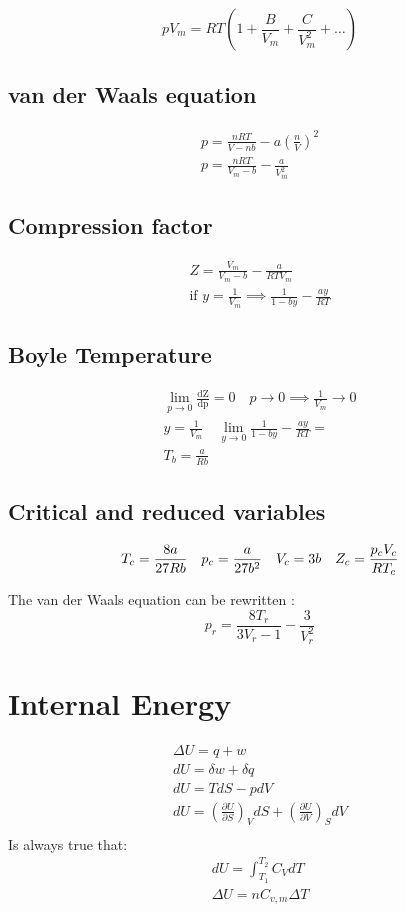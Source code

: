 \documentclass[a4paper]{report}
\begin{document}
\begin{multicols}{2}
        \[
        pV_{m}=RT\left( 1+\frac{B}{V_{m}}+\frac{C}{V^{2}_{m}}+\dots \right) 
        \] 

        \subsection{van der Waals equation}
        \begin{gather*}
          p = \frac{nRT}{V-nb} - a \left(\frac{n}{V} \right) ^{2}  \\
          p = \frac{nRT}{V_{m} - b } - \frac{a}{V_{m}^2}
        \end{gather*}
      \subsection{Compression factor}
      \begin{gather*}
                  Z = \frac{V_{m}}{V_{m}-b} - \frac{a}{RTV_{m}} \\
         \text{if } y = \frac{1}{V_{m} } \implies \frac{1}{1-by} - \frac{ay}{RT} 
      \end{gather*}
      \subsection{Boyle Temperature}
      \begin{gather*}
        \lim_{p \to 0}  \frac{\mathrm{dZ}}{\mathrm{dp}} = 0 \quad p \to 0 \implies \frac{1}{V_{m}} \to 0 \\ 
       y =\frac{1}{V_{m} }\quad  \lim_{y \to 0} \frac{1}{1-by} - \frac{ay}{RT} = \\
        T_{b} = \frac{a}{Rb} 
      \end{gather*}
      \subsection{Critical and reduced variables}
      \[
      T_{c} = \frac{8a}{27Rb} \quad p_{c} = \frac{a}{27b^{2} } \quad V_{c} = 3b \quad Z_{c} = \frac{p_{c} V_{c}}{RT_{c}} \\
      \] 

    The van der Waals equation can be rewritten : 
    \[
      p_{r} = \frac{8T_{r} }{3V_{r} - 1 } - \frac{3}{V^{2} _{r} } 
    \] 


    \section{Internal Energy}
    \begin{gather*}
    \Delta U = q + w\\
    dU = \delta w + \delta q \\
    dU = TdS - pdV \\
    dU = \left( \frac{\partial U}{\partial S}\right)_{V}dS + \left( \frac{\partial U}{\partial V} \right)_{S} dV \\
    \end{gather*}
    Is always true that:
    \begin{gather*}
      dU = \int_{T_1}^{T_2} C_{V}dT  \\
      \Delta U = nC_{v,m}\Delta T 
    \end{gather*}
    

\end{multicols}
\end{document}

